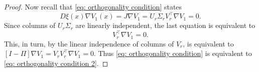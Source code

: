 \documentclass[10pt,a4paper]{amsart}
\begin{document}
\begin{proof}
    Now recall that \eqref{eq: orthogonality condition} states 
    \begin{equation*}
    D\xi(x)\nabla V_1(x) = J\nabla V_1 =  U_r\Sigma_rV_r^\top\nabla V_1 =0.
    \end{equation*}
    Since columns of $U_r\Sigma_r$ are linearly independent, the last equation is equivalent to
    \begin{equation*}
        V_r^\top\nabla V_1 = 0.
    \end{equation*}
    This, in turn, by the linear independence of columns of $V_r$, is equivalent to  $[I - \Pi] \nabla V_1 = V_rV_r^\top\nabla V_1 = 0.$
    Thus \eqref{eq: orthogonality condition} is equivalent to \eqref{eq: orthogonality condition 2}. 
\end{proof}
\end{document}
